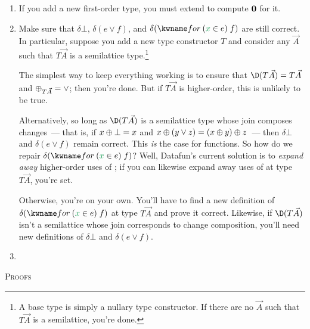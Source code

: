 \documentclass{rntz}\usepackage{fantasy}%
\begin{document}
\begin{enumerate}
\item If you add a new first-order type, you must extend \dummy{} to compute
  $\boldsymbol{0}$ for it.

\item {} Make sure that $\delta\bot$, $\delta(e
  \vee f)$, and $\delta(\eford x e f)$ are still correct. In particular, suppose
  you add a new type constructor $T$ and consider any $\vec A$ such that $T\vec
  A$ is a semilattice type.\footnote{A base type is simply a nullary type
    constructor. If there are no $\vec A$ such that $T\vec A$ is a semilattice,
    you're done.}

  The simplest way to keep everything working is to ensure that $\D(T\vec A) =
  T\vec A$ and $\mathbin{\oplus}_{T\vec A} = \vee$; then you're done. But if $T\vec A$ is
  higher-order, this is unlikely to be true.

  Alternatively, so long as $\D(T\vec A)$ is a semilattice type whose join composes
  changes~--- that is, if $x \mathbin{\oplus} \bot = x$ and $x \mathbin{\oplus} (y \vee z) = (x \mathbin{\oplus} y)
  \mathbin{\oplus} z$~--- then $\delta\bot$ and $\delta(e \vee f)$ remain correct. This
  \emph{is} the case for functions. So how do we repair $\delta(\eford x e f)$?
  Well, Datafun's current solution is to \emph{expand away} higher-order uses of
  ; if you can likewise expand away uses of  at type
  $T\vec A$, you're set.

  Otherwise, you're on your own. You'll have to find a new definition of
  $\delta(\eford x e f)$ at type $T\vec A$ and prove it correct. Likewise, if
  $\D(T\vec A)$ isn't a semilattice whose join corresponds to change
  composition, you'll need new definitions of $\delta\bot$ and $\delta(e \vee f)$.

\item {}

\end{enumerate}


\clearpage
\appendix
\begin{center}\Large\scshape Proofs\end{center}
\renewcommand\qed{\vspace{\baselineskip}\hrule}%

\end{document}
